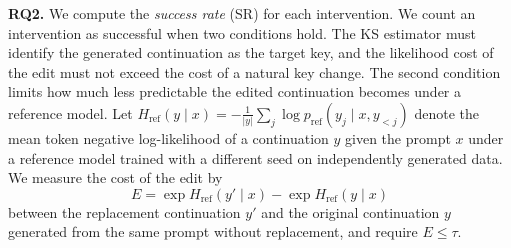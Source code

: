 \documentclass{article}
\begin{document}
\noindent\textbf{RQ2.}
We compute the \emph{success rate} (SR) for each intervention.
We count an intervention as successful when two conditions hold. 
The KS estimator must identify the generated continuation as the target key, and the likelihood cost of the edit must not exceed the cost of a natural key change.
The second condition limits how much less predictable the edited continuation becomes under a reference model.
Let $H_{\mathrm{ref}}(y \mid x) = -\frac{1}{|y|}\sum_{j}\log p_{\mathrm{ref}}(y_j \mid x, y_{<j})$ denote the mean token negative log-likelihood of a continuation $y$ given the prompt $x$ under a reference model trained with a different seed on independently generated data.
We measure the cost of the edit by
\begin{equation}
E = \exp H_{\mathrm{ref}}(y' \mid x) - \exp H_{\mathrm{ref}}(y \mid x)
\end{equation}
between the replacement continuation $y'$ and the original continuation $y$ generated from the same prompt without replacement, and require $E \le \tau$.
\end{document}
